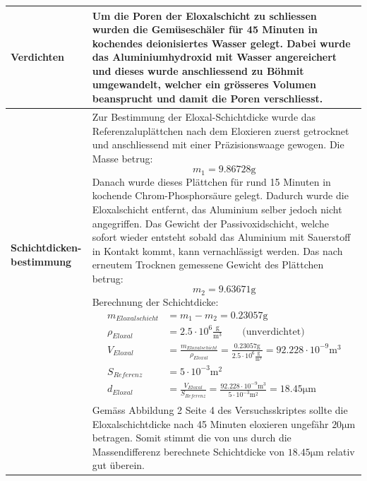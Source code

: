 \begin{longtable}{p{3cm}p{14cm}}
    \textbf{Verdichten}
    & Um die Poren der Eloxalschicht zu schliessen wurden die Gemüseschäler für 45 Minuten in kochendes deionisiertes Wasser gelegt. Dabei wurde das Aluminiumhydroxid mit Wasser angereichert und dieses wurde anschliessend zu Böhmit umgewandelt, welcher ein grösseres Volumen beansprucht und damit die Poren verschliesst.\\
    \hline
    
    \textbf{Schichtdicken-bestimmung}
    & Zur Bestimmung der Eloxal-Schichtdicke wurde das Referenzaluplättchen nach dem Eloxieren zuerst getrocknet und anschliessend mit einer Präzisionswaage gewogen. Die Masse betrug: $$ m_1 = 9.86728 \mathrm{g}$$
    Danach wurde dieses Plättchen für rund 15 Minuten in kochende Chrom-Phosphorsäure gelegt. Dadurch wurde die Eloxalschicht entfernt, das Aluminium selber jedoch nicht angegriffen. Das Gewicht der Passivoxidschicht, welche sofort wieder entsteht sobald das Aluminium mit Sauerstoff in Kontakt kommt, kann vernachlässigt werden. Das nach erneutem Trocknen gemessene Gewicht des Plättchen betrug: $$ m_2 = 9.63671 \mathrm{g}$$
    Berechnung der Schichtdicke:
    $$ \begin{aligned}
            m_{Eloxalschicht} &= m_1 - m_2 = 0.23057 \mathrm{g}\\
            \rho_{Eloxal} &= 2.5\cdot 10^{6} \frac{\mathrm{g}}{\mathrm{m}^3} \qquad \text{(unverdichtet)}\\
            V_{Eloxal} &= \frac{m_{Eloxalschicht}}{\rho_{Eloxal}} = \frac{0.23057 \mathrm{g}}{2.5\cdot 10^{6} \frac{\mathrm{g}}{\mathrm{m}^3}} = 92.228 \cdot 10^{-9} \mathrm{m^3}\\
            S_{Referenz} &= 5 \cdot 10^{-3} \mathrm{m^2}\\
            d_{Eloxal} &= \frac{V_{Eloxal}}{S_{Referenz}} = \frac{92.228 \cdot 10^{-9} \mathrm{m^3}}{5 \cdot 10^{-3} \mathrm{m^2}}= 18.45 \mathrm{\mu m}
       \end{aligned}$$\\
    & Gemäss Abbildung 2 Seite 4 des Versuchsskriptes sollte die Eloxalschichtdicke nach 45 Minuten eloxieren ungefähr $20 \mathrm{\mu m}$ betragen. Somit stimmt die von uns durch die Massendifferenz berechnete Schichtdicke von $18.45 \mathrm{\mu m}$ relativ gut überein.\\
    \hline
\end{longtable}


